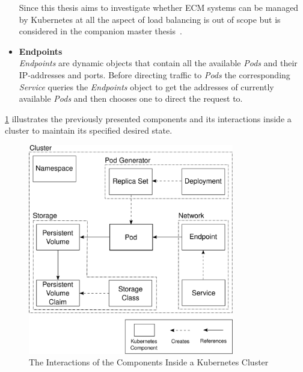 \begin{itemize}
{    Since this thesis aims to investigate whether ECM systems can be managed by Kubernetes at all the aspect of load balancing is out of scope but is considered in the companion master thesis~\cite{pascal2021}.
    }
    \item[]{\textbf{Endpoints}\\
    \textit{Endpoints} are dynamic objects that contain all the available \textit{Pods} and their IP-addresses and ports.
    Before directing traffic to \textit{Pods} the corresponding \textit{Service} queries the \textit{Endpoints} object to get the addresses of currently available \textit{Pods} and then chooses one to direct the request to.
    }
\end{itemize}

\cref{fig:kub_components} illustrates the previously presented components and its interactions inside a cluster to maintain its specified desired state.

\begin{figure}[h]
    \centering
    \includegraphics[width=0.8\textwidth]{graphics/kub_components.svg}
    \caption{The Interactions of the Components Inside a Kubernetes Cluster~\cite{KUB4}}
    \label{fig:kub_components}
\end{figure}

